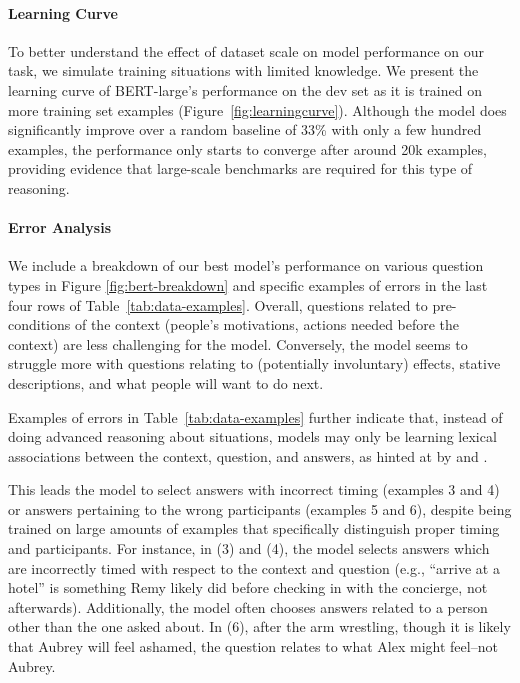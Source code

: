 \paragraph{Learning Curve} To better understand the effect of dataset scale on model performance on our task, we simulate training situations with limited knowledge. We present the learning curve of BERT-large's performance on the dev set as it is trained on more training set examples (Figure~\ref{fig:learningcurve}).
Although the model does significantly improve over a random baseline of 33\% with only a few hundred examples, the performance only starts to converge after around 20k examples, providing evidence that large-scale benchmarks are required for this type of reasoning.

\paragraph{Error Analysis} We include a breakdown of our best model's performance on various question types in Figure \ref{fig:bert-breakdown} and specific examples of errors in the last four rows of Table~\ref{tab:data-examples}.
Overall, questions related to pre-conditions of the context (people's motivations, actions needed before the context) are less challenging for the model. Conversely, the model seems to struggle more with questions relating to (potentially involuntary) effects, stative descriptions, and what people will want to do next.

Examples of errors in Table~\ref{tab:data-examples} further indicate that, instead of doing advanced reasoning about situations, models may only be learning lexical associations between the context, question, and answers, as hinted at by \citet{Marcus2018DeepLA} and \citet{zellers2019hellaswag}.

This leads the model to select answers with incorrect timing (examples 3 and 4) or answers pertaining to the wrong participants (examples 5 and 6), despite being trained on large amounts of examples that specifically distinguish proper timing and participants. For instance, in (3) and (4), the model selects answers which are incorrectly timed with respect to the context and question (e.g., ``arrive at a hotel'' is something Remy likely did before checking in with the concierge, not afterwards). Additionally, the model often chooses answers related to a person other than the one asked about. In (6), after the arm wrestling, though it is likely that Aubrey will feel ashamed, the question relates to what Alex might feel--not Aubrey.

